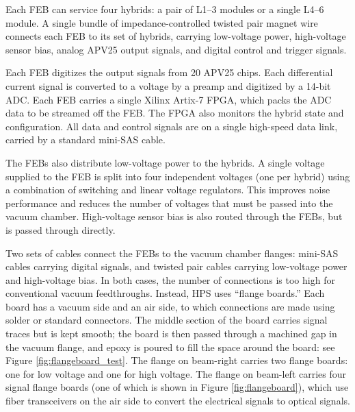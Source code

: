 Each FEB can service four hybrids: a pair of L1--3 modules or a single L4--6 module.
A single bundle of impedance-controlled twisted pair magnet wire connects each FEB to its set of hybrids, carrying low-voltage power, high-voltage sensor bias, analog APV25 output signals, and digital control and trigger signals.

Each FEB digitizes the output signals from 20 APV25 chips.
Each differential current signal is converted to a voltage by a preamp and digitized by a 14-bit ADC.
Each FEB carries a single Xilinx Artix-7 FPGA, which packs the ADC data to be streamed off the FEB.
The FPGA also monitors the hybrid state and configuration.
All data and control signals are on a single high-speed data link, carried by a standard mini-SAS cable.

The FEBs also distribute low-voltage power to the hybrids.
A single voltage supplied to the FEB is split into four independent voltages (one per hybrid) using a combination of switching and linear voltage regulators.
This improves noise performance and reduces the number of voltages that must be passed into the vacuum chamber.
High-voltage sensor bias is also routed through the FEBs, but is passed through directly.

Two sets of cables connect the FEBs to the vacuum chamber flanges: mini-SAS cables carrying digital signals, and twisted pair cables carrying low-voltage power and high-voltage bias.
In both cases, the number of connections is too high for conventional vacuum feedthroughs.
Instead, HPS uses ``flange boards.''
Each board has a vacuum side and an air side, to which connections are made using solder or standard connectors.
The middle section of the board carries signal traces but is kept smooth; the board is then passed through a machined gap in the vacuum flange, and epoxy is poured to fill the space around the board: see Figure \ref{fig:flangeboard_test}.
The flange on beam-right carries two flange boards: one for low voltage and one for high voltage.
The flange on beam-left carries four signal flange boards (one of which is shown in Figure \ref{fig:flangeboard}), which use fiber transceivers on the air side to convert the electrical signals to optical signals.

